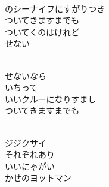 \documentclass[10pt,b5j]{tarticle} %
\begin{document}
\vspace{1.5em} %
\newcommand{\linespace}{0.5em} %
\newcommand{\blocksize}{0.5\hsize} %
\newcommand{\itemmargin}{3em} %
\begin{enumerate} %
    \setlength{\itemindent}{\itemmargin} %
    \begin{minipage}[c]{\blocksize}
    
        \vspace{\linespace}
        \item~\\
        のシーナイフにすがりつき\\
        ついてきますまでも\\
        ついてくのはけれど\\
        せない
        
    \end{minipage}
    \begin{minipage}[c]{\blocksize}
        
        \vspace{\linespace}
        \item~\\
        せないなら\\
        いちって\\
        いいクルーになりすまし\\
        ついてきますまでも
        
    \end{minipage}
    \begin{minipage}[c]{\blocksize}
        
        \vspace{\linespace}
        \item~\\
        ジジクサイ\\
        それぞれあり\\
        いいにゃがい\\
        かせのヨットマン
        

\end{minipage}
\end{enumerate}
\end{document}
